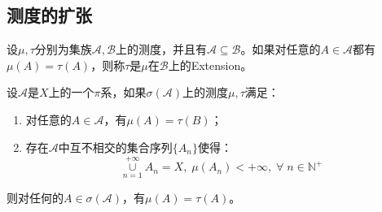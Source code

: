 \subsection{测度的扩张}
\begin{definition}
	设$\mu,\tau$分别为集族$\mathscr{A},\mathscr{B}$上的测度，并且有$\mathscr{A}\subseteq\mathscr{B}$。如果对任意的$A\in \mathscr{A}$都有$\mu(A)=\tau(A)$，则称$\tau$是$\mu$在$\mathscr{B}$上的\gls{Extension}。
\end{definition}
\begin{lemma}\label{lem:PiExtensionMeasure}
	设$\mathscr{A}$是$X$上的一个$\pi$系，如果$\sigma(\mathscr{A})$上的测度$\mu,\tau$满足：
	\begin{enumerate}
		\item 对任意的$A\in \mathscr{A}$，有$\mu(A)=\tau(B)$；
		\item 存在$\mathscr{A}$中互不相交的集合序列$\{A_n\}$使得：
		\begin{equation*}
			\underset{n=1}{\overset{+\infty}{\cup}}A_n=X,\;\mu(A_n)<+\infty,\;\forall\;n\in\mathbb{N}^+
		\end{equation*}
	\end{enumerate}
	则对任何的$A\in\sigma(\mathscr{A})$，有$\mu(A)=\tau(A)$。
\end{lemma}
